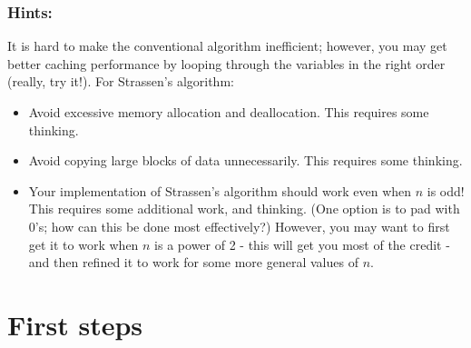 \documentclass[tikz, 12pt]{scrartcl}
\begin{document}
\subsubsection*{Hints:}
It is hard to make the conventional algorithm inefficient; however, you may get better caching performance by looping through the variables in the right order (really, try it!). For Strassen's algorithm:

\begin{itemize}
	\item Avoid excessive memory allocation and deallocation. This requires some thinking.
	\item Avoid copying large blocks of data unnecessarily. This requires some thinking.
	\item Your implementation of Strassen's algorithm should work even when $n$ is odd! This requires some additional work, and thinking. (One option is to pad with 0's; how can this be done most effectively?) However, you may want to first get it to work when $n$ is a power of 2 - this will get you most of the credit - and then refined it to work for some more general values of $n$.
\end{itemize}


%
%		
%		
%		

\section{First steps}
\end{document}
